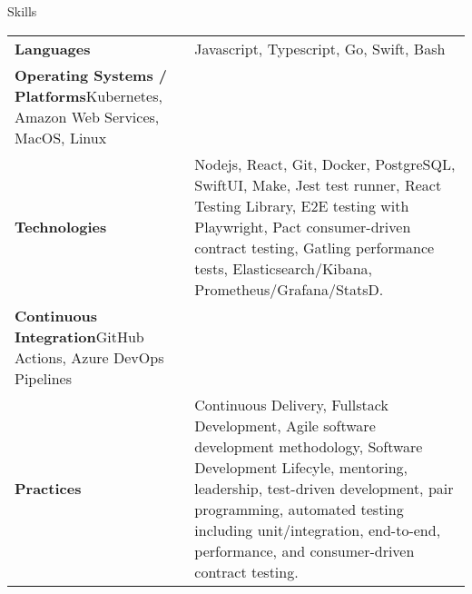 \begin{section}{Skills}
  \begin{tabularx}{\linewidth}{@{}l X@{}}
    \textbf{Languages} &\small{Javascript, Typescript, Go, Swift, Bash} \\
    \textbf{Operating Systems / Platforms}{Kubernetes, Amazon Web Services, MacOS, Linux} \\
    \textbf{Technologies} &\small{Nodejs, React, Git, Docker, PostgreSQL, SwiftUI, Make, Jest test runner, React Testing Library, E2E testing with Playwright, Pact consumer-driven contract testing, Gatling performance tests, Elasticsearch/Kibana, Prometheus/Grafana/StatsD.} \\
    \textbf{Continuous Integration}{GitHub Actions, Azure DevOps Pipelines} \\
    \textbf{Practices} &\small{Continuous Delivery, Fullstack Development, Agile software development methodology, Software Development Lifecyle, mentoring, leadership, test-driven development, pair programming, automated testing including unit/integration, end-to-end, performance, and consumer-driven contract testing.} \\
  \end{tabularx}
\end{section}
